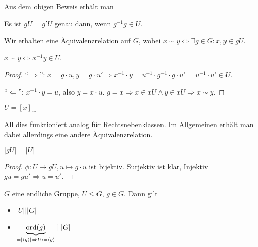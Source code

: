 Aus dem obigen Beweis erhält man 
\begin{corollary}
    Es ist $gU = g'U$ genau dann, wenn $g^{-1}g \in U$.
\end{corollary}

\begin{corollary}
    Wir erhalten eine Äquivalenzrelation auf $G$, wobei $x \sim y \Leftrightarrow \exists g \in G: x,y \in gU$.
\end{corollary}

\begin{lemma}
    $x \sim y \Leftrightarrow x^{-1}y \in U$. 
\end{lemma}
\begin{proof}
    ``$\Rightarrow$'': $x = g\cdot u, y = g\cdot u' \Rightarrow x^{-1}\cdot y = u^{-1}\cdot g^{-1} \cdot g \cdot u' = u^{-1} \cdot u' \in U$.

    ``$\Leftarrow$'': $x^{-1}\cdot y = u$, also $y = x\cdot u$. $g = x \Rightarrow x \in xU \land y \in xU \Rightarrow x \sim y$. 
\end{proof}

\begin{lemma}
    $U = [x]_{\sim}$
\end{lemma}

All dies funktioniert analog für Rechtsnebenklassen. Im Allgemeinen erhält man dabei allerdings eine andere Äquivalenzrelation.

\begin{lemma}
    $\vert gU \vert = \vert U \vert$
\end{lemma}
\begin{proof}
    $\phi: U \to gU, u \mapsto g\cdot u$ ist bijektiv. Surjektiv ist klar, Injektiv $gu = gu' \Rightarrow u = u'$.
\end{proof}

\begin{theorem}
    $G$ eine endliche Gruppe, $U \le G$, $g \in G$. Dann gilt
    \begin{itemize}[topsep=0cm, label={--}]
        \item $\vert U \vert \mid \vert G \vert$ 
        \item $\underbrace{\operatorname{ord}(g)}_{= \vert \langle g \rangle \vert \Rightarrow U := \langle g \rangle} \mid \vert G \vert $
    \end{itemize}
\end{theorem}

\begin{example}
    
\end{example}

